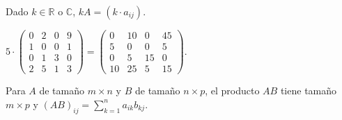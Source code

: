 \begin{definition}
Dado $k \in \mathbb{R}$ o $\mathbb{C}$, $kA = (k \cdot a_{ij})$.
\end{definition}
\begin{example} $5 \cdot \begin{pmatrix} 0 & 2 & 0 & 9 \\ 1 & 0 & 0 & 1 \\ 0 & 1 & 3 & 0 \\ 2 & 5 & 1 & 3 \end{pmatrix} = \begin{pmatrix} 0 & 10 & 0 & 45 \\ 5 & 0 & 0 & 5 \\ 0 & 5 & 15 & 0 \\ 10 & 25 & 5 & 15 \end{pmatrix}.$
\end{example}

\begin{definition}
Para $A$ de tamaño $m \times n$ y $B$ de tamaño $n \times p$, el producto $AB$ tiene tamaño $m \times p$ y $(AB)_{ij} = \sum_{k=1}^n a_{ik}b_{kj}$.
\end{definition}

